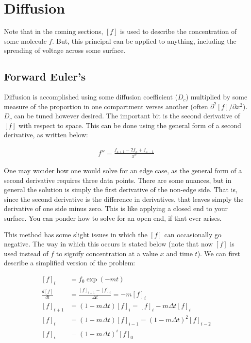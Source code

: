 \documentclass[12pt]{report}
\begin{document}
\section{Diffusion}

 Note that in the coming sections, $[f]$ is used to describe the concentration of some molecule $f$. But, this principal can be applied to anything, including the spreading of voltage across some surface. 

\subsection{Forward Euler's} Diffusion is accomplished using some diffusion coefficient ($D_c$) multiplied by some measure of the proportion in one compartment verses another (often $\partial^2 [f]/\partial x^2)$. $D_c$ can be tuned however desired. The important bit is the second derivative of $[f]$ with respect to space. This can be done using the general form of a second derivative, as written below: 

\begin{equation} \label{diff1}
\begin{split}
f'' = \frac{f_{x + 1} - 2f_x + f_{x - 1}}{x^2}
\end{split}
\end{equation}

\bigskip

One may wonder how one would solve for an edge case, as the general form of a second derivative requires three data points. There are some nuances, but in general the solution is simply the first derivative of the non-edge side. That is, since the second derivative is the difference in derivatives, that leaves simply the derivative of one side minus zero. This is like applying a closed end to your surface. You can ponder how to solve for an open end, if that ever arises.\newline

This method has some slight issues in which the $[f]$ can occasionally go negative. The way in which this occurs is stated below (note that now $[f]$ is used instead of $f$ to signify concentration at a value $x$ and time $t$). We can first describe a simplified version of the problem:

\begin{equation} \label{eq8}
\begin{split}
[f]_i & = f_0\exp(-mt) \\
\frac{d[f]}{dt} & = \frac{[f]_{i+1} - [f]_{i}}{\Delta t} = -m[f]_i \\
[f]_{i+1} & = (1-m\Delta t)[f]_i = [f]_i - m\Delta t [f]_i \\
[f]_{i} & = (1-m\Delta t)[f]_{i-1} = (1-m\Delta t)^2[f]_{i-2} \\
[f]_{i} & = (1-m\Delta t)^i[f]_{0} \\
\end{split}
\end{equation}
\end{document}
